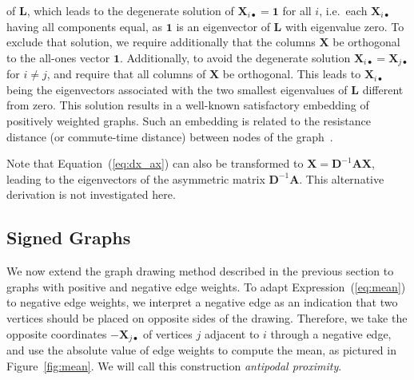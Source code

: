 \documentclass[11pt,a4paper]{book}
\begin{document}
of $\mathbf L$, which leads to the degenerate
solution of $\mathbf X_{i \bullet} = \mathbf 1$ for all $i$, i.e.\ each
$\mathbf X_{i \bullet}$ having
all components equal, as $\mathbf 1$ is an
eigenvector of $\mathbf L$ with eigenvalue zero.  To exclude that solution, we
require additionally that the columns $\mathbf X$ be orthogonal to the
all-ones vector
$\mathbf 1$.
Additionally, to avoid the degenerate solution $\mathbf X_{
  i\bullet}=\mathbf X_{j \bullet}$
for $i \neq j$, and require that all columns of $\mathbf X$ be
orthogonal. 
This leads to $\mathbf X_{i \bullet}$ being the
eigenvectors associated with the two smallest eigenvalues
of $\mathbf L$ different from
zero.  This solution results in a well-known satisfactory embedding of
positively weighted graphs.  Such an embedding is related to the resistance
distance (or commute-time distance) between nodes of the
graph~\cite{b287}.

Note that Equation~(\ref{eq:dx_ax}) can also be transformed to $\mathbf X
= \mathbf D^{-1} \mathbf A\mathbf X$, leading to the eigenvectors of the
asymmetric matrix $\mathbf D^{-1} \mathbf A$.  This alternative
derivation is not investigated here. 

\subsection{Signed Graphs}
\label{subsec:general-weighted-graphs}
We now extend the graph drawing method described in the previous section
to graphs with positive and negative edge weights.  
To adapt Expression~(\ref{eq:mean}) to negative edge weights, we interpret a
negative edge as an indication that two vertices should be placed on
opposite sides of the drawing.  
Therefore, we take the opposite coordinates $-\mathbf X_{j \bullet}$ of vertices $j$
adjacent to $i$ through a negative edge,
and use the absolute value of edge weights to compute the mean, as
pictured in Figure~\ref{fig:mean}.  We will call this construction
\emph{antipodal proximity}. 
\end{document}
